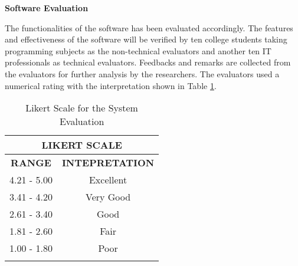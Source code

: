 \flushleft
\textbf{Software Evaluation}
\justifying

\parx
The functionalities of the software has been evaluated accordingly. The
features and effectiveness of the software will be verified by ten college
students taking programming subjects as the non-technical evaluators and another ten
IT professionals as technical evaluators. Feedbacks and remarks are collected from the
evaluators for further analysis by the researchers. The evaluators used a numerical
rating with the interpretation shown in Table \ref{table:ratings_scale}.

\begin{longtable}[c]{|c|c|}
\hline
\multicolumn{2}{|c|}{\textbf{LIKERT SCALE}} \\ \hline
\endfirsthead
%
\endhead
%
\textbf{RANGE}   & \textbf{INTEPRETATION}   \\ \hline
4.21 - 5.00      & Excellent                \\ \hline
3.41 - 4.20      & Very Good                \\ \hline
2.61 - 3.40      & Good                     \\ \hline
1.81 - 2.60      & Fair                     \\ \hline
1.00 - 1.80      & Poor                     \\ \hline
\caption{Likert Scale for the System Evaluation}
\label{table:ratings_scale}
\end{longtable}





